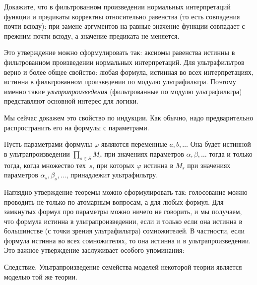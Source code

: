 \begin{problem}
Докажите, что в фильтрованном произведении нормальных
интерпретаций функции и предикаты корректны относительно
равенства (то есть совпадения почти всюду): при замене
аргументов на равные значение функции совпадает с прежним почти
всюду, а значение предиката не меняется.
\end{problem}

Это утверждение можно сформулировать так: аксиомы равенства
истинны в фильтрованном произведении нормальных интерпретаций.
Для ультрафильтров верно и более общее свойство: любая формула,
истинная во всех интерпретациях, истинна в фильтрованном
произведении по модулю ультрафильтра. Поэтому именно такие
\emph{ультрапроизведения}%
(фильтрованные по модулю
ультрафильтра) представляют основной интерес для логики.

Мы сейчас докажем это свойство по индукции. Как обычно, надо
предварительно распространить его на формулы с параметрами.

\begin{theorem}
%
%
Пусть параметрами формулы $\varphi$ являются переменные
$a,b,\dots$ Она будет истинной в ультрапроизведении $\prod_{s\in
S} M_s$ при значениях параметров $\alpha,\beta,\dots$ тогда и
только тогда, когда множество тех~$s$, при которых $\varphi$
истинна в $M_s$ при значениях параметров
$\alpha_s,\beta_s,\dots$, принадлежит ульт\-ра\-фильтру.
\end{theorem}

Наглядно утверждение теоремы можно сформулировать так:
голосование можно проводить не только по атомарным вопросам, а
для любых формул. Для замкнутых формул про параметры можно
ничего не говорить, и мы получаем, что формула истинна в
ультрапроизведении, если и только если она истинна в большинстве
(с точки зрения ультрафильтра) сомножителей. В частности, если формула
истинна во всех сомножителях, то она истинна и в ультрапроизведении.
Это важное утверждение заслуживает особого упоминания:

\textsf{Следствие}. Ультрапроизведение семейства
моделей некоторой те\-о\-рии
является моделью той же теории.

